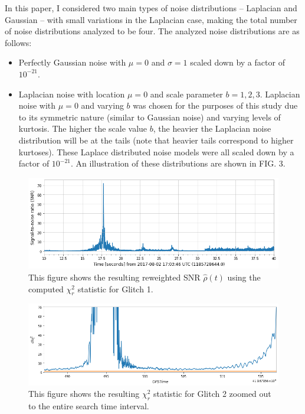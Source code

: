 \documentclass[preprint,
letterpaper,
 amsmath,amssymb,
 aps,
]{revtex4-2}
\begin{document}
In this paper, I considered two main types of noise distributions – Laplacian and Gaussian – with small variations in the Laplacian case, making the total number of noise distributions analyzed to be four. The analyzed noise distributions are as follows:
\begin{itemize}
    \item Perfectly Gaussian noise with $\mu = 0$  and $\sigma = 1$ scaled down by a factor of $10^{-21}$.
    \item Laplacian noise with location $\mu = 0$ and scale parameter $b = 1,2,3$. Laplacian noise with  $\mu = 0$ and varying $b$ was chosen for the purposes of this study due to its symmetric nature (similar to Gaussian noise) and varying levels of kurtosis. The higher the scale value $b$, the heavier the Laplacian noise distribution will be at the tails (note that heavier tails correspond to higher kurtoses). These Laplace distributed noise models were all scaled down by a factor of $10^{-21}$. An illustration of these distributions are shown in FIG. 3.
\end{itemize}

\begin{figure}[t]
\includegraphics[width = .9\textwidth]{reweighted glitch 1.png}
\caption{This figure shows the resulting reweighted SNR $\hat{\rho}(t)$ using the computed $\chi^2_r$ statistic for Glitch 1.}
\centering
\end{figure} 

\begin{figure}
\includegraphics[width = .9\textwidth]{chi2 glitch 2 zoomed.png}
\caption{This figure shows the resulting $\chi^2_r$ statistic for Glitch 2 zoomed out to the entire search time interval.}
\centering
\end{figure}
\end{document}

